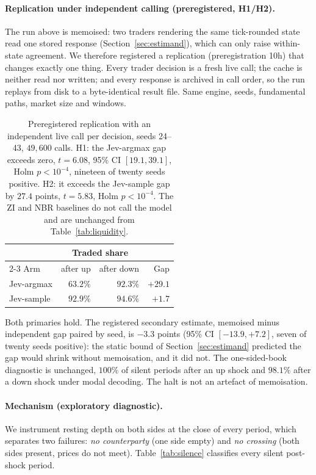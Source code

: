 \documentclass[11pt]{article}
\begin{document}
\paragraph{Replication under independent calling (preregistered, H1/H2).}
\label{sec:independent}
The run above is memoised: two traders rendering the same tick-rounded state
read one stored response (Section~\ref{sec:estimand}), which can only raise
within-state agreement. We therefore registered a replication
(preregistration 10h) that changes exactly one thing. Every trader decision is
a fresh live call; the cache is neither read nor written; and every response is
archived in call order, so the run replays from disk to a byte-identical result
file. Same engine, seeds, fundamental paths, market size and windows.

\begin{table}[t]
\centering
\begin{tabular}{lrrr}
\toprule
& \multicolumn{2}{c}{Traded share} & \\
\cmidrule(lr){2-3}
Arm & after up & after down & Gap \\
\midrule
Jev-argmax   & $63.2\%$ & $92.3\%$ & $+29.1$ \\
Jev-sample   & $92.9\%$ & $94.6\%$ & $+1.7$ \\
\bottomrule
\end{tabular}
\caption{Preregistered replication with an independent live call per decision,
seeds 24--43, $49{,}600$ calls. H1: the Jev-argmax gap exceeds zero, $t=6.08$,
95\% CI $[19.1, 39.1]$, Holm $p<10^{-4}$, nineteen of twenty seeds positive.
H2: it exceeds the Jev-sample gap by $27.4$ points, $t=5.83$, Holm
$p<10^{-4}$. The ZI and NBR baselines do not call the model and are unchanged
from Table~\ref{tab:liquidity}.}
\label{tab:independent}
\end{table}

Both primaries hold. The registered secondary estimate, memoised minus
independent gap paired by seed, is $-3.3$ points (95\% CI $[-13.9, +7.2]$,
seven of twenty seeds positive): the static bound of
Section~\ref{sec:estimand} predicted the gap would shrink without memoisation,
and it did not. The one-sided-book diagnostic is unchanged, $100\%$ of silent
periods after an up shock and $98.1\%$ after a down shock under modal decoding.
The halt is not an artefact of memoisation.

\paragraph{Mechanism (exploratory diagnostic).} We instrument resting depth on both sides at
the close of every period, which separates two failures: \emph{no counterparty}
(one side empty) and \emph{no crossing} (both sides present, prices do not
meet). Table~\ref{tab:silence} classifies every silent post-shock period.
\end{document}
